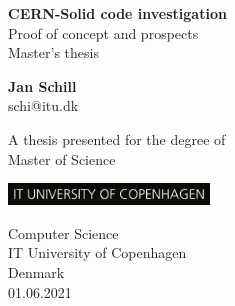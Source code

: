 \documentclass[runningheads]{llncs}
\begin{document}
\begin{titlepage}
   \begin{center}
       \vspace*{1cm}
       \Huge
       \textbf{CERN-Solid code investigation}\\
       \LARGE
       \vspace{0.5cm}
        Proof of concept and prospects\\
       \vspace{1cm}
       \large
       Master’s thesis
       \vspace{1cm}
        \LARGE
       

       \textbf{Jan Schill}\\
       schi@itu.dk

       \vfill
            
      A thesis presented for the degree of\\
      Master of Science
            
       \vspace{0.8cm}
     
       \includegraphics[width=0.4\textwidth]{assets/university.jpg}
    
       \Large
       Computer Science\\
       IT University of Copenhagen\\
       Denmark\\
       01.06.2021
            
   \end{center}
\end{titlepage}


\tableofcontents
\newpage


\printglossary[type=\acronymtype]

\newpage
\printbibliography
\end{document}
